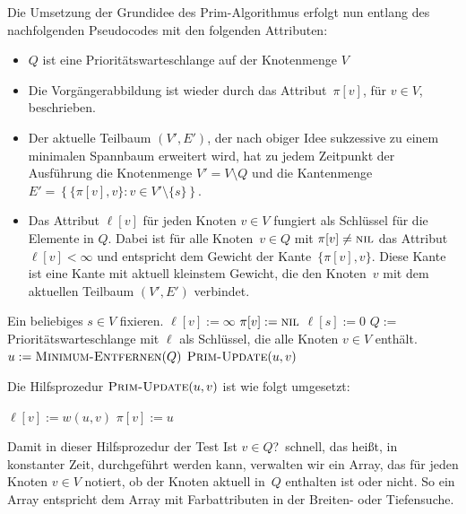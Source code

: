 \begin{bem}
Die Umsetzung der Grundidee des Prim-Algorithmus erfolgt nun entlang des nachfolgenden Pseudocodes mit den folgenden Attributen:
\begin{itemize}
 \item $Q$ ist eine Prioritätswarteschlange auf der Knotenmenge $V$
 \item Die Vorgängerabbildung ist wieder durch das Attribut~$\pi[v]$, für $v \in V$, beschrieben.
 \item Der aktuelle Teilbaum $(V',E')$, der nach obiger Idee sukzessive zu einem minimalen Spannbaum erweitert wird, hat zu jedem Zeitpunkt der Ausführung die Knotenmenge $V' = V \setminus Q$ und die Kantenmenge $E' = \left\{\{\pi[v],v\} : v \in V' \setminus \{s\}\right\}$.
 \item Das Attribut $\ell[v]$ für jeden Knoten $v \in V$ fungiert als Schlüssel für die Elemente in $Q$. Dabei ist für alle Knoten~$v \in Q$ mit $\pi[v] \neq \mathop{\text{\textsc{nil}}}$ das Attribut $\ell[v] < \infty$ und entspricht dem Gewicht der Kante~$\{\pi[v],v\}$.
Diese Kante ist eine Kante mit aktuell kleinstem Gewicht, die den Knoten~$v$ mit dem aktuellen Teilbaum $(V',E')$ verbindet.
\end{itemize}


\begin{algorithm}[H]
\caption{$\cc{Prim}(G)$}
\begin{algorithmic}[1]
 \STATE Ein beliebiges $s \in V$ fixieren.
 \STATE{}
  \STATE $\ell[v] := \infty$
  \STATE $\pi[v] := \mathop{\text{\textsc{nil}}}$
 \ENDFOR
 \STATE $\ell[s] := 0$
 \STATE $Q := $ Prioritätswarteschlange mit $\ell$ als Schlüssel, die alle Knoten $v \in V$ enthält.
 \STATE{}
  \STATE $u := \mathop{\text{\textsc{Minimum-Entfernen}}}(Q)$ 
   \STATE $\cc{Prim-Update}(u,v)$
  \ENDFOR
 \ENDWHILE
\end{algorithmic}
\end{algorithm}

Die Hilfsprozedur $\cc{Prim-Update}(u,v)$ ist wie folgt umgesetzt:

\begin{algorithm}[H]
	\caption{$\cc{Prim-Update}(u,v)$}
	\begin{algorithmic}[1]
		\STATE $\ell[v]:=w(u,v)$
		\STATE $\pi[v] := u$
		\ENDIF
	\end{algorithmic}
\end{algorithm}

Damit in dieser Hilfsprozedur der Test \glqq Ist $v \in Q$?\grqq\ schnell, das heißt, in konstanter Zeit, durchgeführt werden kann, verwalten wir ein Array, das für jeden Knoten $v \in V$ notiert, ob der Knoten aktuell in~$Q$ enthalten ist oder nicht. So ein Array entspricht dem Array mit Farbattributen in der Breiten- oder Tiefensuche. 
\end{bem}

